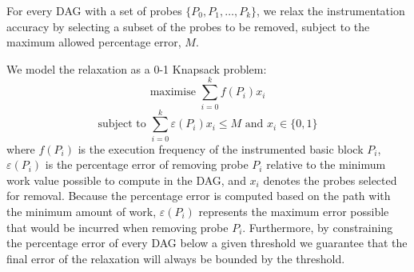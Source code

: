 For every DAG with a set of probes $\{P_0, P_1, \ldots, P_k\}$, we relax the instrumentation accuracy by selecting a subset of the probes to be removed, subject to the maximum allowed percentage error, $M$.

We model the relaxation as a 0-1 Knapsack problem:
\[
\textrm{maximise } \sum_{i=0}^{k} f(P_i)x_i
\]
\[
\textrm{subject to } \sum_{i=0}^{k} \varepsilon(P_i)x_i \leq M \textrm{ and } x_i\in\{0,1\}
\]
where $f(P_i)$ is the execution frequency of the instrumented basic block $P_i$, $\varepsilon(P_i)$ is the percentage error of removing probe $P_i$ relative to the minimum work value possible to compute in the DAG, and $x_i$ denotes the probes selected for removal.
Because the percentage error is computed based on the path with the minimum amount of work, $\varepsilon(P_i)$ represents the maximum error possible that would be incurred when removing probe $P_i$.
Furthermore, by constraining the percentage error of every DAG below a given threshold we guarantee that the final error of the relaxation will always be bounded by the threshold.

